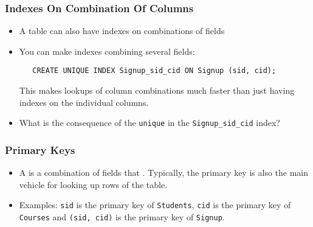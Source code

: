 \documentclass[dvipsnames]{beamer}
\begin{document}
\begin{frame}[fragile=singleslide]
  \frametitle{Indexes On Combination Of Columns}
  \begin{itemize}
  \item A table can also have indexes on combinations of fields
 
\item You can make indexes combining several fields:
\begin{small}
\begin{verbatim}
   CREATE UNIQUE INDEX Signup_sid_cid ON Signup (sid, cid);
\end{verbatim}
\end{small}

This makes lookups of column combinations much faster than just having
indexes on the individual columns.

\item What is the consequence of the \texttt{unique} in the
\verb+Signup_sid_cid+ index?
  \end{itemize}
\end{frame}



\begin{frame}
\frametitle{Primary Keys}

\begin{itemize}  
\item A  is a combination of fields that . Typically, the primary key is also the
  main vehicle for looking up rows of the table.

\item Examples: \texttt{sid} is the primary key of \texttt{Students},
\texttt{cid} is the primary key of \texttt{Courses} and \texttt{(sid, cid)}
is the primary key of \texttt{Signup}.

\end{itemize}
\end{frame}
\end{document}
